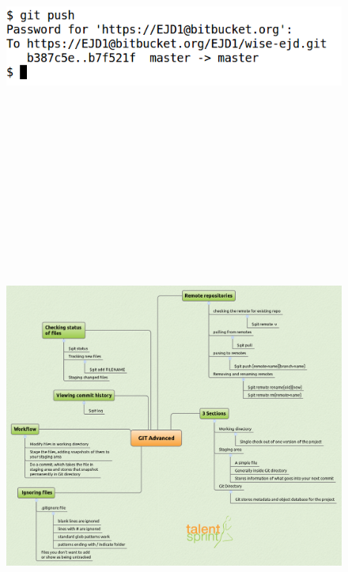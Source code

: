\documentclass[11pt,a4paper]{article}
\begin{document}
\begin{figure}[H]
    \begin{center}
        \includegraphics[scale=0.4]{clone-push.png}       
    \end{center}
\end{figure}
\vfill{\ }

\begin{figure}[H]
 \begin{center}
   \includegraphics[angle=90,height=20cm, width=13cm]{Git-MM-22.png}
 \end{center}
 \end{figure}
\end{document}
